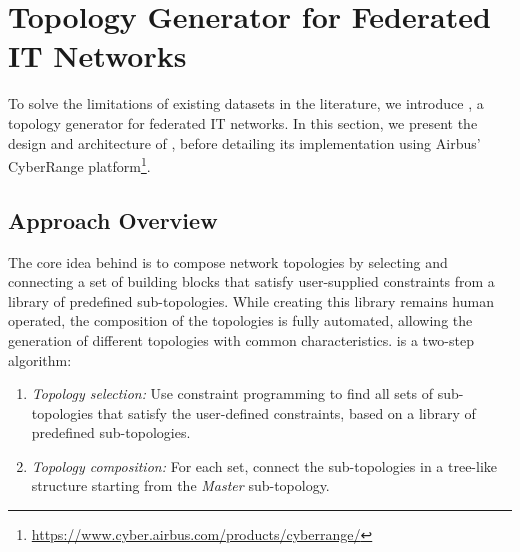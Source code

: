 \section{Topology Generator for Federated IT Networks\label{sec:topologies.approach}}

To solve the limitations of existing datasets in the literature, we introduce \thecontrib, a topology generator for federated IT networks.
In this section, we present the design and architecture of \thecontrib, before detailing its implementation using Airbus' CyberRange platform\footnote{\url{https://www.cyber.airbus.com/products/cyberrange/}}.


\subsection{Approach Overview\label{sec:topologies.approach.overview}}

The core idea behind \thecontrib is to compose network topologies by selecting and connecting a set of building blocks that satisfy user-supplied constraints from a library of predefined sub-topologies.
While creating this library remains human operated, the composition of the topologies is fully automated, allowing the generation of different topologies with common characteristics.
\thecontrib is a two-step algorithm:
\begin{enumerate}
  \item \emph{Topology selection:} Use constraint programming to find all sets of sub-topologies that satisfy the user-defined constraints, based on a library of predefined sub-topologies.
  \item \emph{Topology composition:} For each set, connect the sub-topologies in a tree-like structure starting from the \emph{Master} sub-topology.
\end{enumerate}

